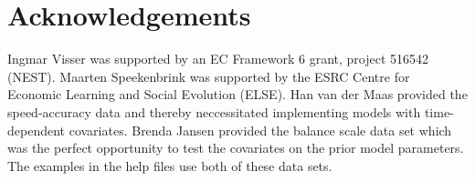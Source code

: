 \documentclass[article]{jss}
\begin{document}
\section*{Acknowledgements} 

Ingmar Visser was supported by an EC Framework 6 grant, project 516542
(NEST).  Maarten Speekenbrink was supported by the ESRC Centre for
Economic Learning and Social Evolution (ELSE).  Han van der Maas
provided the speed-accuracy data \cite{Dutilh2009} and thereby
neccessitated implementing models with time-dependent covariates.
Brenda Jansen provided the balance scale data set \citep{Jansen2002}
which was the perfect opportunity to test the covariates on the prior
model parameters.  The examples in the help files use both of these
data sets.



\end{document}
